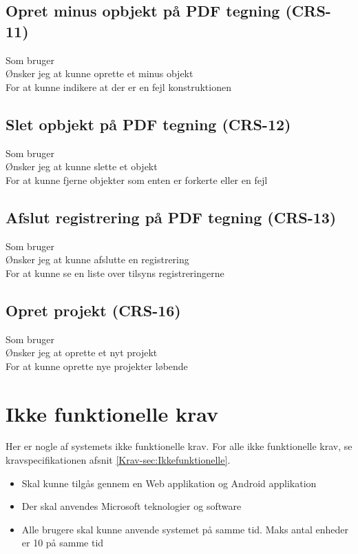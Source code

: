 	\subsection*{Opret minus opbjekt på PDF tegning (CRS-11)}
	Som bruger\\
	Ønsker jeg at kunne oprette et minus objekt\\
	For at kunne indikere at der er en fejl konstruktionen

	\subsection*{Slet opbjekt på PDF tegning (CRS-12)}
	Som bruger\\
	Ønsker jeg at kunne slette et objekt\\
	For at kunne fjerne objekter som enten er forkerte eller en fejl 

	\subsection*{Afslut registrering på PDF tegning (CRS-13)}
	Som bruger\\
	Ønsker jeg at kunne afslutte en registrering\\
	For at kunne se en liste over tilsyns registreringerne
	
	\subsection*{Opret projekt (CRS-16)}
	Som bruger\\
	Ønsker jeg at oprette et nyt projekt\\
	For at kunne oprette nye projekter løbende
	

	\section{Ikke funktionelle krav}
	Her er nogle af systemets ikke funktionelle krav. For alle ikke funktionelle krav, se kravspecifikationen afsnit \ref{Krav-sec:Ikkefunktionelle}.
	\begin{itemize}[-]
		\itemsep 0.3em 
		\item Skal kunne tilgås gennem en Web applikation og Android applikation
		\item Der skal anvendes Microsoft teknologier og software
		\item Alle brugere skal kunne anvende systemet på samme tid. Maks antal enheder er 10 på samme tid %
	\end{itemize}


